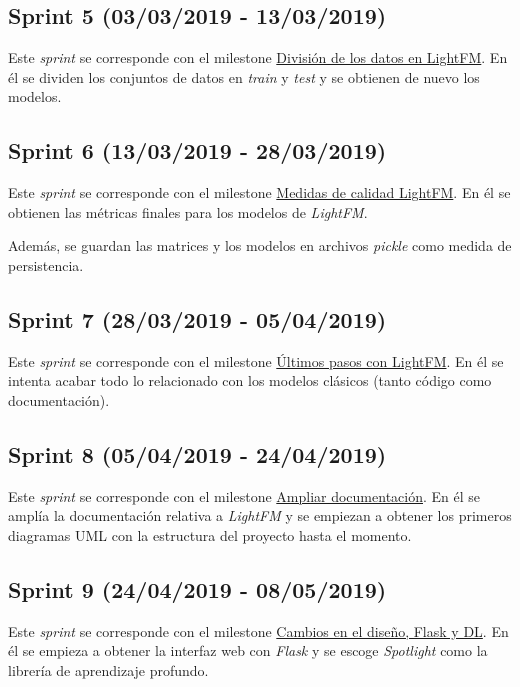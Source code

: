 \subsection{Sprint 5 (03/03/2019 - 13/03/2019)}\label{sprint-5}
Este \textit{sprint} se corresponde con el milestone \href{https://github.com/rnc0011/SistemaRecomendacionTFG/milestone/6}{División de los datos en LightFM}. En él se dividen los conjuntos de datos en \textit{train} y \textit{test} y se obtienen de nuevo los modelos.

\subsection{Sprint 6 (13/03/2019 - 28/03/2019)}\label{sprint-6}
Este \textit{sprint} se corresponde con el milestone \href{https://github.com/rnc0011/SistemaRecomendacionTFG/milestone/7}{Medidas de calidad LightFM}. En él se obtienen las métricas finales para los modelos de \textit{LightFM}.

Además, se guardan las matrices y los modelos en archivos \textit{pickle} como medida de persistencia.

\subsection{Sprint 7 (28/03/2019 - 05/04/2019)}\label{sprint-7}
Este \textit{sprint} se corresponde con el milestone \href{https://github.com/rnc0011/SistemaRecomendacionTFG/milestone/8}{Últimos pasos con LightFM}. En él se intenta acabar todo lo relacionado con los modelos clásicos (tanto código como documentación).

\subsection{Sprint 8 (05/04/2019 - 24/04/2019)}\label{sprint-8}
Este \textit{sprint} se corresponde con el milestone \href{https://github.com/rnc0011/SistemaRecomendacionTFG/milestone/9}{Ampliar documentación}. En él se amplía la documentación relativa a \textit{LightFM} y se empiezan a obtener los primeros diagramas UML con la estructura del proyecto hasta el momento.

\subsection{Sprint 9 (24/04/2019 - 08/05/2019)}\label{sprint-9}
Este \textit{sprint} se corresponde con el milestone \href{https://github.com/rnc0011/SistemaRecomendacionTFG/milestone/10}{Cambios en el diseño, Flask y DL}. En él se empieza a obtener la interfaz web con \textit{Flask} y se escoge \textit{Spotlight} como la librería de aprendizaje profundo.

